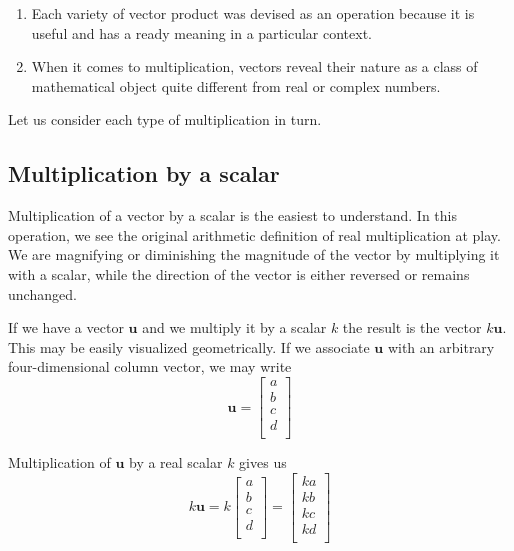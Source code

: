 \documentclass[
  a4paper,
]{article}
\begin{document}
\begin{enumerate}
\def\labelenumi{\arabic{enumi}.}
\setcounter{enumi}{3}
\item
  Each variety of vector product was devised as an operation because it
  is useful and has a ready meaning in a particular context.
\item
  When it comes to multiplication, vectors reveal their nature as a
  class of mathematical object quite different from real or complex
  numbers.
\end{enumerate}

Let us consider each type of multiplication in turn.

\hypertarget{multiplication-by-a-scalar}{%
\subsection{Multiplication by a
scalar}\label{multiplication-by-a-scalar}}

Multiplication of a vector by a scalar is the easiest to understand. In
this operation, we see the original arithmetic definition of real
multiplication at play. We are magnifying or diminishing the magnitude
of the vector by multiplying it with a scalar, while the direction of
the vector is either reversed or remains unchanged.

If we have a vector \(\symbf{u}\) and we multiply it by a scalar \(k\)
the result is the vector \(k\symbf{u}\). This may be easily visualized
geometrically. If we associate \(\symbf{u}\) with an arbitrary
four-dimensional column vector, we may write \[
\symbf{u} = \begin{bmatrix}a\\b\\c\\d\\\end{bmatrix}
\]

Multiplication of \(\symbf{u}\) by a real scalar \(k\) gives us \[
k\symbf{u} = k\begin{bmatrix}a\\b\\c\\d\\\end{bmatrix} = \begin{bmatrix}ka\\kb\\kc\\kd\\\end{bmatrix}
\]
\end{document}

